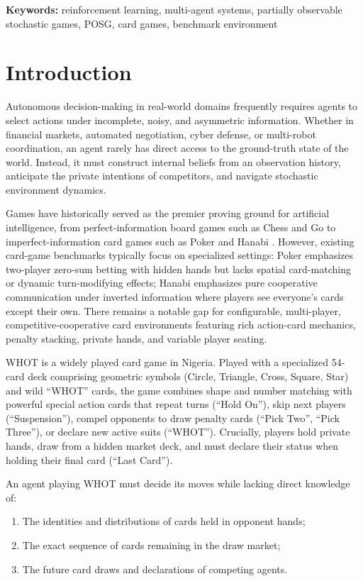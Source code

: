 \documentclass[11pt]{article}
\begin{document}
\noindent\textbf{Keywords:} reinforcement learning, multi-agent systems, partially observable stochastic games, POSG, card games, benchmark environment

\section{Introduction}

Autonomous decision-making in real-world domains frequently requires agents to select actions under incomplete, noisy, and asymmetric information. Whether in financial markets, automated negotiation, cyber defense, or multi-robot coordination, an agent rarely has direct access to the ground-truth state of the world. Instead, it must construct internal beliefs from an observation history, anticipate the private intentions of competitors, and navigate stochastic environment dynamics.

Games have historically served as the premier proving ground for artificial intelligence, from perfect-information board games such as Chess and Go \citep{silver2018general} to imperfect-information card games such as Poker \citep{moravcik2017deepstack,brown2018superhuman,brown2019superhuman} and Hanabi \citep{bard2020hanabi}. However, existing card-game benchmarks typically focus on specialized settings: Poker emphasizes two-player zero-sum betting with hidden hands but lacks spatial card-matching or dynamic turn-modifying effects; Hanabi emphasizes pure cooperative communication under inverted information where players see everyone's cards except their own. There remains a notable gap for configurable, multi-player, competitive-cooperative card environments featuring rich action-card mechanics, penalty stacking, private hands, and variable player seating.

WHOT is a widely played card game in Nigeria. Played with a specialized 54-card deck comprising geometric symbols (Circle, Triangle, Cross, Square, Star) and wild ``WHOT'' cards, the game combines shape and number matching with powerful special action cards that repeat turns (``Hold On''), skip next players (``Suspension''), compel opponents to draw penalty cards (``Pick Two'', ``Pick Three''), or declare new active suits (``WHOT''). Crucially, players hold private hands, draw from a hidden market deck, and must declare their status when holding their final card (``Last Card'').

An agent playing WHOT must decide its moves while lacking direct knowledge of:
\begin{enumerate}
  \item The identities and distributions of cards held in opponent hands;
  \item The exact sequence of cards remaining in the draw market;
  \item The future card draws and declarations of competing agents.
\end{enumerate}
\end{document}

